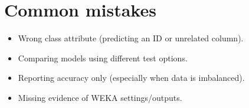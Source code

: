 \documentclass[11pt]{article}
\begin{document}
\section{Common mistakes}
\begin{itemize}[leftmargin=*]
  \item Wrong class attribute (predicting an ID or unrelated column).
  \item Comparing models using different test options.
  \item Reporting accuracy only (especially when data is imbalanced).
  \item Missing evidence of WEKA settings/outputs.
\end{itemize}

\notesources{\AIMLLabSources}
\end{document}
